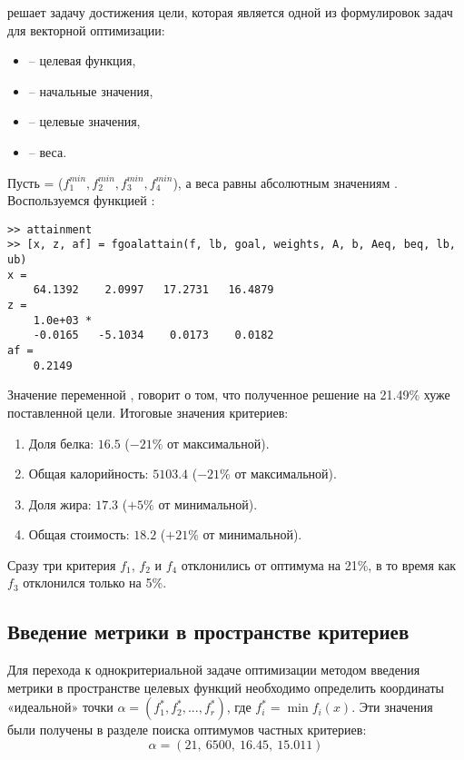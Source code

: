 решает задачу достижения цели, которая является одной из формулировок
задач для векторной оптимизации: 

\noindent {}

\begin{itemize}
	\item {} -- целевая функция,
	\item {} -- начальные значения,
	\item {} -- целевые значения,
	\item {} -- веса.
\end{itemize}

Пусть  = ($f_1^{min}, f_2^{min}, f_3^{min}, f_4^{min}$), а веса  равны абсолютным значениям . Воспользуемся функцией :



\begin{lstlisting}[caption=\code{Console}]
>> attainment
>> [x, z, af] = fgoalattain(f, lb, goal, weights, A, b, Aeq, beq, lb, ub)
x =
	64.1392    2.0997   17.2731   16.4879
z =
	1.0e+03 *
	-0.0165   -5.1034    0.0173    0.0182
af =
	0.2149
\end{lstlisting}

Значение переменной , говорит о том, что полученное решение на 21.49\% хуже поставленной цели. Итоговые значения критериев:

\begin{enumerate}
	\item Доля белка: $16.5$ ($-21\%$ от максимальной).
	\item Общая калорийность: $5103.4$ ($-21\%$ от максимальной).
	\item Доля жира: $17.3$ ($+5\%$ от минимальной).
	\item Общая стоимость: $18.2$ ($+21\%$ от минимальной).
\end{enumerate}

Сразу три критерия $f_1$, $f_2$ и $f_4$ отклонились от оптимума на 21\%, в то время как $f_3$ отклонился только на 5\%.

\subsection{Введение метрики в пространстве критериев}

Для перехода к однокритериальной задаче оптимизации методом введения метрики в пространстве целевых функций необходимо определить координаты «идеальной» точки $\alpha = (f_1^*, f_2^*, ..., f_r^*)$,  где $f_i^* = \min f_i(x)$. Эти значения были получены в разделе поиска оптимумов частных критериев:
$$
\alpha = (21,\ 6500,\ 16.45,\ 15.011)
$$


